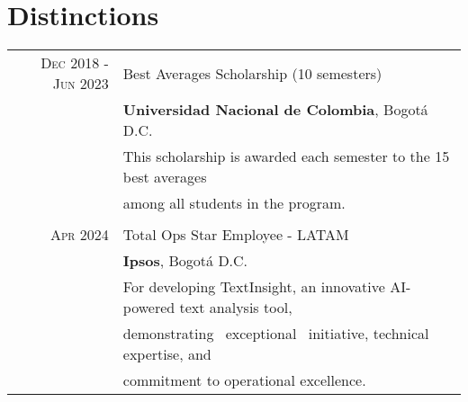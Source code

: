 \documentclass[a4paper,10pt]{article} %
\begin{document}





\section{Distinctions}

\begin{tabular}{r|l}
\textsc{Dec} 2018 - \textsc{Jun} 2023 & Best Averages Scholarship (10 semesters)\\
& \normalsize\textbf{Universidad Nacional de Colombia}, Bogotá D.C.\\
& This scholarship is awarded each semester to the 15 best averages \\& among all students in the program.\\
\\
\textsc{Apr} 2024 & Total Ops Star Employee - LATAM \\
& \normalsize\textbf{Ipsos}, Bogotá D.C.\\
& For developing TextInsight, an innovative AI-powered text analysis tool,  \\
& demonstrating \ exceptional \ initiative, technical expertise, and \\
& commitment to operational excellence.
\end{tabular}

\vspace{1em}
\end{document}
